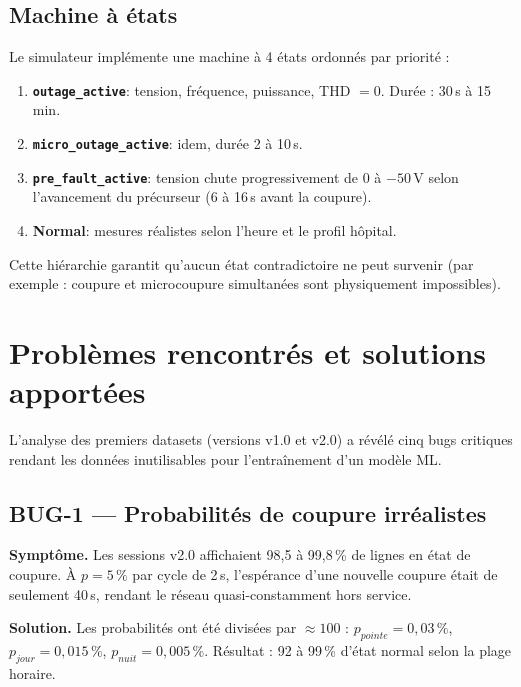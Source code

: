 \documentclass[12pt,a4paper]{article}
\begin{document}
\subsection{Machine à états}

Le simulateur implémente une machine à 4 états ordonnés par priorité :

\begin{enumerate}[label=\arabic*.]
  \item \textbf{\texttt{outage\_active}}: tension, fréquence, puissance, THD $= 0$.
        Durée : 30\,s à 15\,min.
  \item \textbf{\texttt{micro\_outage\_active}}: idem, durée 2 à 10\,s.
  \item \textbf{\texttt{pre\_fault\_active}}: tension chute progressivement de 0 à $-50$\,V
        selon l'avancement du précurseur (6 à 16\,s avant la coupure).
  \item \textbf{Normal}: mesures réalistes selon l'heure et le profil hôpital.
\end{enumerate}

Cette hiérarchie garantit qu'aucun état contradictoire ne peut survenir
(par exemple : coupure et microcoupure simultanées sont physiquement impossibles).

\section{Problèmes rencontrés et solutions apportées}

L'analyse des premiers datasets (versions v1.0 et v2.0) a révélé cinq bugs critiques
rendant les données inutilisables pour l'entraînement d'un modèle ML.

\subsection*{BUG-1 — Probabilités de coupure irréalistes}

\textbf{Symptôme.} Les sessions v2.0 affichaient 98,5 à 99,8\,\% de lignes en état
de coupure. À $p = 5\,\%$ par cycle de 2\,s, l'espérance d'une nouvelle coupure
était de seulement 40\,s, rendant le réseau quasi-constamment hors service.

\textbf{Solution.} Les probabilités ont été divisées par $\approx 100$ :
$p_{pointe} = 0{,}03\,\%$, $p_{jour} = 0{,}015\,\%$, $p_{nuit} = 0{,}005\,\%$.
Résultat : 92 à 99\,\% d'état normal selon la plage horaire.
\end{document}
